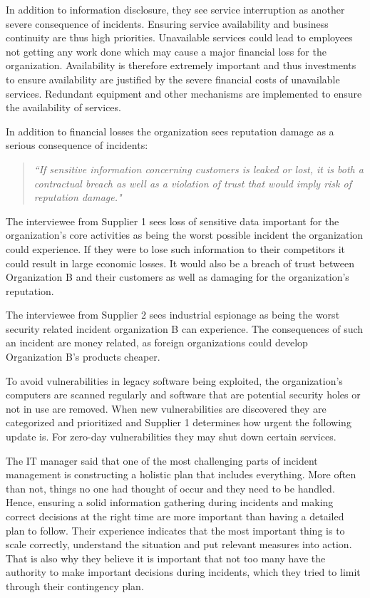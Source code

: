 In addition to information disclosure, they see service interruption as another severe consequence of incidents. Ensuring service availability and business continuity are thus high priorities. Unavailable services could lead to employees not getting any work done which may cause a major financial loss for the organization. Availability is therefore extremely important and thus investments to ensure availability are justified by the severe financial costs of unavailable services. Redundant equipment and other mechanisms are implemented to ensure the availability of services. 

In addition to financial losses the organization sees reputation damage as a serious consequence of incidents: 

\begin{quote}
\textit{``If sensitive information concerning customers is leaked or lost, it is both a contractual breach as well as a violation of trust that would imply risk of reputation damage."}
\end{quote}

The interviewee from Supplier 1 sees loss of sensitive data important for the organization's core activities as being the worst possible incident the organization could experience. If they were to lose such information to their competitors it could result in large economic losses. It would also be a breach of trust between Organization B and their customers as well as damaging for the organization's reputation.	

The interviewee from Supplier 2 sees industrial espionage as being the worst security related incident organization B can experience. %
The consequences of such an incident are money related, as foreign organizations could develop Organization B's products cheaper. 

To avoid vulnerabilities in legacy software being exploited, the organization's computers are scanned regularly and software that are potential security holes or not in use are removed. When new vulnerabilities are discovered they are categorized and prioritized and Supplier 1 determines how urgent the following update is. For zero-day vulnerabilities they may shut down certain services.

The \acs{IT} manager said that one of the most challenging parts of incident management is constructing a holistic plan that includes everything. More often than not, things no one had thought of occur and they need to be handled. Hence, ensuring a solid information gathering during incidents and making correct decisions at the right time are more important than having a detailed plan to follow. Their experience indicates that the most important thing is to scale correctly, understand the situation and put relevant measures into action. That is also why they believe it is important that not too many have the authority to make important decisions during incidents, which they tried to limit through their contingency plan.

